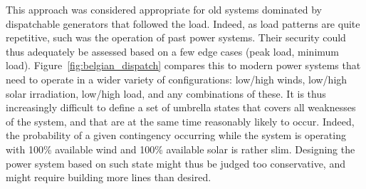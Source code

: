 This approach was considered appropriate for old systems dominated by dispatchable generators that followed the load. Indeed, as load patterns are quite repetitive, such was the operation of past power systems. Their security could thus adequately be assessed based on a few edge cases (peak load, minimum load). Figure~\ref{fig:belgian_dispatch} compares this to modern power systems that need to operate in a wider variety of configurations: low/high winds, low/high solar irradiation, low/high load, and any combinations of these. It is thus increasingly difficult to define a set of umbrella states that covers all weaknesses of the system, and that are at the same time reasonably likely to occur. Indeed, the probability of a given contingency occurring while the system is operating with 100\% available wind and 100\% available solar is rather slim. Designing the power system based on such state might thus be judged too conservative, and might require building more lines than desired. %

